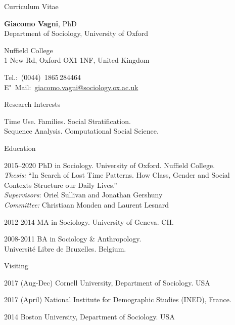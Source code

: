 \documentclass[12pt,a4paper]{article}
\begin{document}
\begin{cv}{Curriculum Vitae}
  \begin{cvlist}{}
  \item \textbf{Giacomo Vagni}, PhD \\
     Department of Sociology, University of Oxford
    \item Nuffield College \\ 
    1 New Rd, Oxford OX1 1NF, United Kingdom
  \item Tel.:~(0044)~1865\,284464\\
    E"~Mail:~\href{mailto:giacomo.vagni@sociology.ox.ac.uk}{giacomo.vagni@sociology.ox.ac.uk}
    
    
  \end{cvlist}
  
  \begin{cvlist}{Research Interests}
  \item[] Time Use. Families. Social Stratification. \\  Sequence Analysis. Computational Social Science. 
  \end{cvlist}
  
  \begin{cvlist}{Education}
  \item[2015--2020] PhD in Sociology. University of Oxford. Nuffield College. \\
  \emph{Thesis:} ``In Search of Lost Time Patterns. How Class, Gender and Social Contexts Structure our Daily Lives.'' \\
  \emph{Supervisors}: Oriel Sullivan and Jonathan Gershuny \\ 
  \emph{Committee:} Christiaan Monden and Laurent Lesnard
  
  \item[2012-2014] MA in Sociology. University of Geneva. CH. 
  \item[2008-2011] BA in Sociology \& Anthropology. \\ Universit{\'e} Libre de Bruxelles. Belgium. 
  \end{cvlist}
  
      \begin{cvlist}{Visiting}
      	\item[2017 (Aug-Dec)] Cornell University, Department of Sociology. USA 
      	\item[2017 (April)] National Institute for Demographic Studies (INED), France. 
      	\item[2014] Boston University, Department of Sociology. USA
      \end{cvlist}
      

\end{cv}
\end{document}
